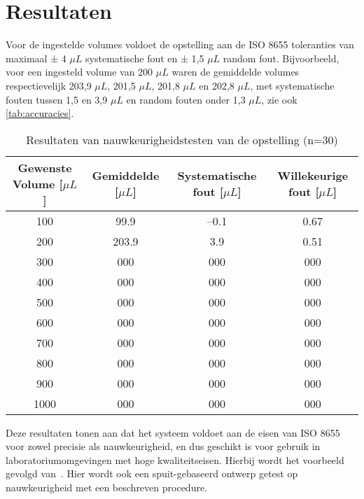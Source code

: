 \chapter{Resultaten}
Voor de ingestelde volumes voldoet de opstelling aan de ISO 8655 toleranties van maximaal ± 4 $\mu L$ systematische fout en ± 1{,}5 $\mu L$ random fout. Bijvoorbeeld, voor een ingesteld volume van 200 $\mu L$ waren de gemiddelde volumes respectievelijk 203{,}9 $\mu L$, 201{,}5 $\mu L$, 201{,}8 $\mu L$ en 202{,}8 $\mu L$, met systematische fouten tussen 1{,}5 en 3{,}9 $\mu L$ en random fouten onder 1{,}3 $\mu L$, zie ook \autoref{tab:accuracies}.

\begin{table}[H] 
    \centering 
    \caption{Resultaten van nauwkeurigheidstesten van de opstelling (n=30)}
    \begin{tabular}{|c|c|c|c|}
        \hline
        \textbf{Gewenste Volume [$\mu L$]} & \textbf{Gemiddelde [$\mu L$]} & \textbf{Systematische fout [$\mu L$]} & \textbf{Willekeurige fout [$\mu L$]}\\
        \hline
        100 & 99.9 & –0.1 & 0.67 \\
        200 & 203.9 & 3.9 & 0.51 \\ 
        300 & 000 & 000 & 000 \\
        400 & 000 & 000 & 000 \\
        500 & 000 & 000 & 000 \\
        600 & 000 & 000 & 000 \\
        700 & 000 & 000 & 000 \\
        800 & 000 & 000 & 000 \\
        900 & 000 & 000 & 000 \\
        1000 & 000 & 000 & 000 \\   
        \hline
    \end{tabular}\label{tab:accuracies}
\end{table}

Deze resultaten tonen aan dat het systeem voldoet aan de eisen van ISO 8655 voor zowel precisie als nauwkeurigheid, en dus geschikt is voor gebruik in laboratoriumomgevingen met hoge kwaliteitseisen.
Hierbij wordt het voorbeeld gevolgd van\ \cite{RN49}. Hier wordt ook een spuit-gebaseerd ontwerp getest op nauwkeurigheid met een beschreven procedure.
